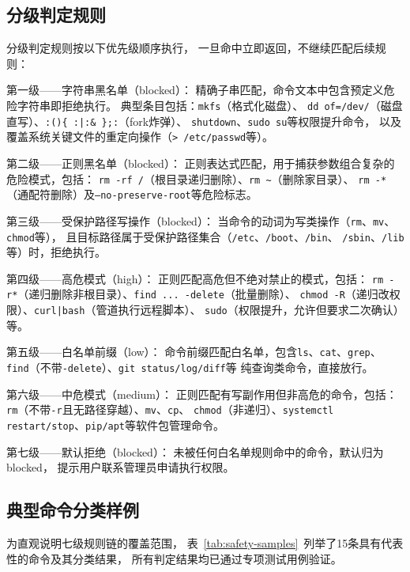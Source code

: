 \subsection{分级判定规则}
\label{subsec:grading-rules}

分级判定规则按以下优先级顺序执行，
一旦命中立即返回，不继续匹配后续规则：

第一级——字符串黑名单（blocked）：
精确子串匹配，命令文本中包含预定义危险字符串即拒绝执行。
典型条目包括：\texttt{mkfs}（格式化磁盘）、
\texttt{dd of=/dev/}（磁盘直写）、\texttt{:()\{ :|:\& \};:}（fork炸弹）、
\texttt{shutdown}、\texttt{sudo su}等权限提升命令，
以及覆盖系统关键文件的重定向操作（\texttt{> /etc/passwd}等）。

第二级——正则黑名单（blocked）：
正则表达式匹配，用于捕获参数组合复杂的危险模式，包括：
\texttt{rm -rf /}（根目录递归删除）、\texttt{rm \textasciitilde}（删除家目录）、
\texttt{rm -*}（通配符删除）及\texttt{--no-preserve-root}等危险标志。

第三级——受保护路径写操作（blocked）：
当命令的动词为写类操作（\texttt{rm}、\texttt{mv}、\texttt{chmod}等），
且目标路径属于受保护路径集合（\texttt{/etc}、\texttt{/boot}、\texttt{/bin}、
\texttt{/sbin}、\texttt{/lib}等）时，拒绝执行。

第四级——高危模式（high）：
正则匹配高危但不绝对禁止的模式，包括：
\texttt{rm -r*}（递归删除非根目录）、\texttt{find ... -delete}（批量删除）、
\texttt{chmod -R}（递归改权限）、\texttt{curl|bash}（管道执行远程脚本）、
\texttt{sudo}（权限提升，允许但要求二次确认）等。

第五级——白名单前缀（low）：
命令前缀匹配白名单，包含\texttt{ls}、\texttt{cat}、\texttt{grep}、
\texttt{find}（不带\texttt{-delete}）、\texttt{git status/log/diff}等
纯查询类命令，直接放行。

第六级——中危模式（medium）：
正则匹配有写副作用但非高危的命令，包括：
\texttt{rm}（不带\texttt{-r}且无路径穿越）、\texttt{mv}、\texttt{cp}、
\texttt{chmod}（非递归）、\texttt{systemctl restart/stop}、\texttt{pip/apt}等软件包管理命令。

第七级——默认拒绝（blocked）：
未被任何白名单规则命中的命令，默认归为blocked，
提示用户联系管理员申请执行权限。

\subsection{典型命令分类样例}

为直观说明七级规则链的覆盖范围，
表~\ref{tab:safety-samples}~列举了15条具有代表性的命令及其分类结果，
所有判定结果均已通过专项测试用例验证。

